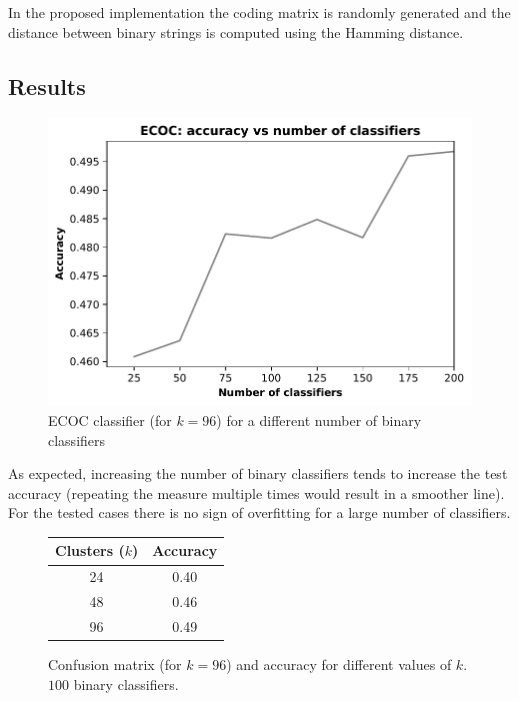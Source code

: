 \documentclass[12pt]{article}
\begin{document}
  In the proposed implementation the coding matrix is randomly generated and the distance between binary strings is computed using the Hamming distance.


  \subsection*{Results}

  \begin{figure}[H]
    \centering
    \caption*{ECOC classifier (for \( k = 96 \)) for a different number of binary classifiers}
    \includegraphics[width=.6\linewidth]{img/ecocb.pdf}
  \end{figure}

  As expected, increasing the number of binary classifiers tends to increase the test accuracy (repeating the measure multiple times would result in a smoother line). For the tested cases there is no sign of overfitting for a large number of classifiers.


  \begin{figure}[H]
    \centering
    \caption*{Confusion matrix (for \( k = 96 \)) and accuracy for different values of \( k \). \( 100 \) binary classifiers.}
    \quad\quad\quad
    \begin{tabular}[b]{cc}
			\toprule
      Clusters (\( k \)) & Accuracy \\
      \midrule
      24  & 0.40 \\
      48  & 0.46 \\
      96  & 0.49 \\
      \bottomrule
    \end{tabular}
  \end{figure}
\end{document}

